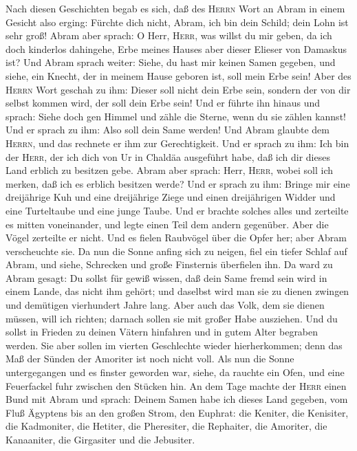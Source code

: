  Nach diesen Geschichten begab es sich, daß des
\textsc{Herrn} Wort an Abram in einem Gesicht also erging: Fürchte dich
nicht, Abram, ich bin dein Schild; dein Lohn ist sehr groß!
 Abram aber sprach: O Herr, \textsc{Herr}, was willst du
mir geben, da ich doch kinderlos dahingehe, Erbe meines Hauses aber
dieser Elieser von Damaskus ist?  Und Abram sprach weiter:
Siehe, du hast mir keinen Samen gegeben, und siehe, ein Knecht, der in
meinem Hause geboren ist, soll mein Erbe sein!  Aber des
\textsc{Herrn} Wort geschah zu ihm: Dieser soll nicht dein Erbe sein,
sondern der von dir selbst kommen wird, der soll dein Erbe sein!
 Und er führte ihn hinaus und sprach: Siehe doch gen
Himmel und zähle die Sterne, wenn du sie zählen kannst! Und er sprach zu
ihm: Also soll dein Same werden!  Und Abram glaubte dem
\textsc{Herrn}, und das rechnete er ihm zur Gerechtigkeit.
 Und er sprach zu ihm: Ich bin der \textsc{Herr}, der ich
dich von Ur in Chaldäa ausgeführt habe, daß ich dir dieses Land erblich
zu besitzen gebe.  Abram aber sprach: Herr, \textsc{Herr},
wobei soll ich merken, daß ich es erblich besitzen werde? 
Und er sprach zu ihm: Bringe mir eine dreijährige Kuh und eine
dreijährige Ziege und einen dreijährigen Widder und eine Turteltaube und
eine junge Taube.  Und er brachte solches alles und
zerteilte es mitten voneinander, und legte einen Teil dem andern
gegenüber. Aber die Vögel zerteilte er nicht.  Und es
fielen Raubvögel über die Opfer her; aber Abram verscheuchte sie.
 Da nun die Sonne anfing sich zu neigen, fiel ein tiefer
Schlaf auf Abram, und siehe, Schrecken und große Finsternis überfielen
ihn.  Da ward zu Abram gesagt: Du sollst für gewiß
wissen, daß dein Same fremd sein wird in einem Lande, das nicht ihm
gehört; und daselbst wird man sie zu dienen zwingen und demütigen
vierhundert Jahre lang.  Aber auch das Volk, dem sie
dienen müssen, will ich richten; darnach sollen sie mit großer Habe
ausziehen.  Und du sollst in Frieden zu deinen Vätern
hinfahren und in gutem Alter begraben werden.  Sie aber
sollen im vierten Geschlechte wieder hierherkommen; denn das Maß der
Sünden der Amoriter ist noch nicht voll.  Als nun die
Sonne untergegangen und es finster geworden war, siehe, da rauchte ein
Ofen, und eine Feuerfackel fuhr zwischen den Stücken hin.
 An dem Tage machte der \textsc{Herr} einen Bund mit
Abram und sprach: Deinem Samen habe ich dieses Land gegeben, vom Fluß
Ägyptens bis an den großen Strom, den Euphrat:  die
Keniter, die Kenisiter, die Kadmoniter,  die Hetiter, die
Pheresiter, die Rephaiter,  die Amoriter, die Kanaaniter,
die Girgasiter und die Jebusiter.

